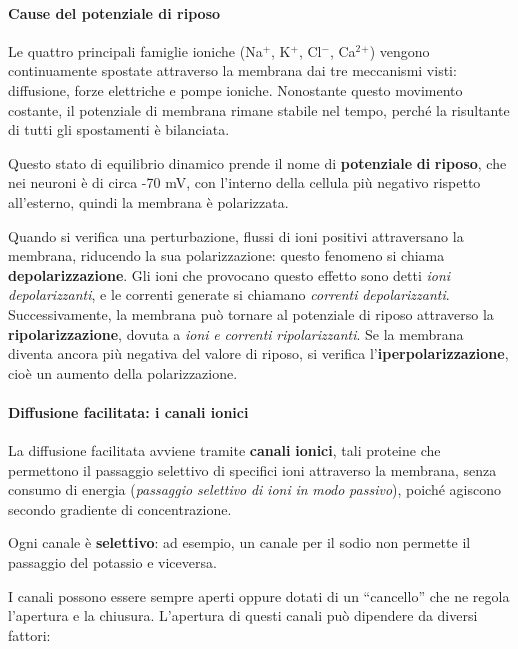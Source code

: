 \documentclass[12pt,a4paper]{book}
\begin{document}
\paragraph{Cause del potenziale di riposo}

Le quattro principali famiglie ioniche (Na$^{+}$, K$^{+}$, Cl$^{-}$, Ca$^{2}$$^{+}$) vengono continuamente spostate attraverso la membrana dai tre meccanismi visti: diffusione, forze elettriche e pompe ioniche. Nonostante questo movimento costante, il potenziale di membrana rimane stabile nel tempo, perché la risultante di tutti gli spostamenti è bilanciata.

Questo stato di equilibrio dinamico prende il nome di \textbf{potenziale}\textbf{ }\textbf{di}\textbf{ }\textbf{riposo}, che nei neuroni è di circa -70 mV, con l'interno della cellula più negativo rispetto all'esterno, quindi la membrana è polarizzata.

Quando si verifica una perturbazione, flussi di ioni positivi attraversano la membrana, riducendo la sua polarizzazione: questo fenomeno si chiama \textbf{depolarizzazione}. Gli ioni che provocano questo effetto sono detti \textit{ioni}\textit{ }\textit{depolarizzanti}, e le correnti generate si chiamano \textit{correnti}\textit{ }\textit{depolarizzanti}. Successivamente, la membrana può tornare al potenziale di riposo attraverso la \textbf{ripolarizzazione}, dovuta a \textit{ioni}\textit{ }\textit{e}\textit{ }\textit{correnti}\textit{ }\textit{ripolarizzanti}. Se la membrana diventa ancora più negativa del valore di riposo, si verifica l'\textbf{iperpolarizzazione}, cioè un aumento della polarizzazione.


\paragraph{Diffusione facilitata: i canali ionici}

La diffusione facilitata avviene tramite \textbf{canali}\textbf{ }\textbf{ionici}, tali proteine che permettono il passaggio selettivo di specifici ioni attraverso la membrana, senza consumo di energia (\textit{passaggio}\textit{ }\textit{selettivo}\textit{ }\textit{di}\textit{ }\textit{ioni}\textit{ }\textit{in}\textit{ }\textit{modo}\textit{ }\textit{passivo}), poiché agiscono secondo gradiente di concentrazione.

Ogni canale è \textbf{selettivo}: ad esempio, un canale per il sodio non permette il passaggio del potassio e viceversa.

I canali possono essere sempre aperti oppure dotati di un ``cancello'' che ne regola l'apertura e la chiusura. L'apertura di questi canali può dipendere da diversi fattori:
\end{document}
